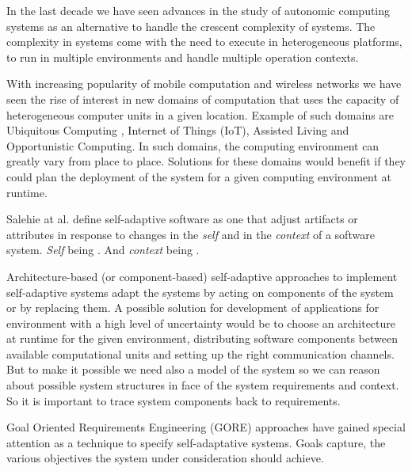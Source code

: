 In the last decade we have seen advances in the study of autonomic computing systems as an alternative to handle the crescent complexity of systems. The complexity in systems come with the need to execute in heterogeneous platforms, to run in multiple environments and handle multiple operation contexts.


With increasing popularity of mobile computation and wireless networks we have seen the rise of  interest in new domains of computation that uses the capacity of heterogeneous computer units in a given location.
Example of such domains are Ubiquitous Computing \cite{bell_yesterdays_2007}, Internet of Things (IoT)\cite{atzori_internet_2010}, Assisted Living\cite{kleinberger_ambient_2007} and Opportunistic Computing\cite{smaldone_improving_2011}. In such domains, the computing environment can greatly vary from place to place.
Solutions for these domains would benefit if they could plan the deployment of the system for a given computing environment at runtime.

 Salehie at al. \cite{salehie_self-adaptive_2009} define self-adaptive software as one that adjust artifacts or attributes in response to changes in the \textit{self} and in the \textit{context} of a software system.
\textit{Self} being . And \textit{context} being .

Architecture-based (or component-based) self-adaptive approaches to implement self-adaptive systems adapt the systems by acting on components of the system or by replacing them\cite{garlan_software_2009}. A possible solution for development of applications for environment with a high level of uncertainty would be to choose an architecture at runtime for the given environment, distributing software components between available computational units and setting up the right communication channels. But to make it possible we need also a model of the system so we can reason about possible system structures in face of the system requirements and context.
So it is important to trace system components back to requirements.

Goal Oriented Requirements Engineering (GORE) approaches have gained special attention as a technique to specify self-adaptative systems\cite{morandini_goal-oriented_2009}.
Goals capture, the various objectives the system under consideration should achieve\cite{van_lamsweerde_goal-oriented_2001}.

